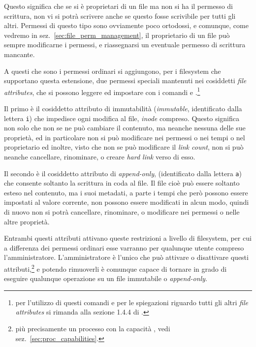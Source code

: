 Questo significa che se si è proprietari di un file ma non si ha il permesso
di scrittura, non vi si potrà scrivere anche se questo fosse scrivibile per
tutti gli altri. Permessi di questo tipo sono ovviamente poco ortodossi, e
comunque, come vedremo in sez.~\ref{sec:file_perm_management}, il proprietario
di un file può sempre modificarne i permessi, e riassegnarsi un eventuale
permesso di scrittura mancante.


A questi che sono i permessi ordinari si aggiungono, per i filesystem che
supportano questa estensione, due permessi speciali mantenuti nei cosiddetti
\textit{file attributes}, che si possono leggere ed impostare con i comandi
 e .\footnote{per l'utilizzo di questi comandi e per
  le spiegazioni riguardo tutti gli altri \textit{file attributes} si rimanda
  alla sezione 1.4.4 di \cite{AGL}.}

Il primo è il cosiddetto attributo di immutabilità (\textit{immutable},
identificato dalla lettera \texttt{i}) che impedisce ogni modifica al file,
\textit{inode} compreso. Questo significa non solo che non se ne può cambiare
il contenuto, ma neanche nessuna delle sue proprietà, ed in particolare non si
può modificare nei permessi o nei tempi o nel proprietario ed inoltre, visto
che non se può modificare il \textit{link count}, non si può neanche
cancellare, rinominare, o creare \textit{hard link} verso di esso.

Il secondo è il cosiddetto attributo di \textit{append-only}, (identificato
dalla lettera \texttt{a}) che consente soltanto la scrittura in coda al
file. Il file cioè può essere soltanto esteso nel contenuto, ma i suoi
metadati, a parte i tempi che però possono essere impostati al valore
corrente, non possono essere modificati in alcun modo, quindi di nuovo non si
potrà cancellare, rinominare, o modificare nei permessi o nelle altre
proprietà.

Entrambi questi attributi attivano queste restrizioni a livello di filesystem,
per cui a differenza dei permessi ordinari esse varranno per qualunque utente
compreso l'amministratore. L'amministratore è l'unico che può attivare o
disattivare questi attributi,\footnote{più precisamente un processo con la
  capacità , vedi
  sez.~\ref{sec:proc_capabilities}.} e potendo rimuoverli è comunque capace di
tornare in grado di eseguire qualunque operazione su un file immutabile o
\textit{append-only}.




